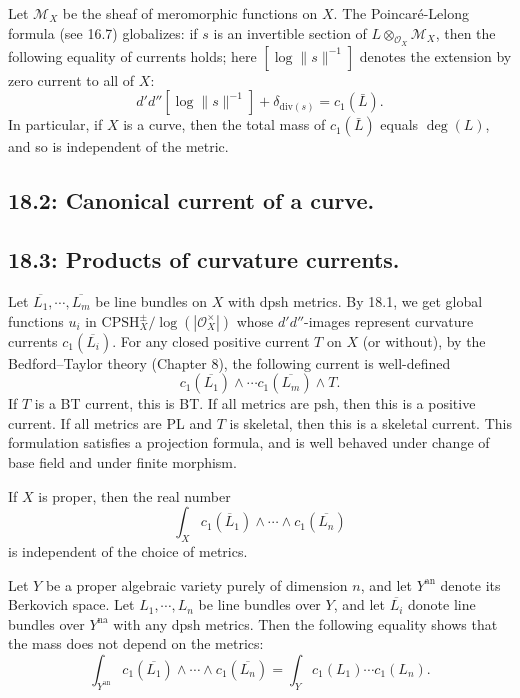 \documentclass[12pt,reqno]{amsart}
\theoremstyle{definition}
\theoremstyle{remark}
\theoremstyle{citedrem}
\theoremstyle{cited}
\theoremstyle{citeddef}
\theoremstyle{step}
\newcommand{\na}{\mathrm{na}}
\begin{document}
Let $\mathcal{M}_X$ be the sheaf of meromorphic functions on $X$. The Poincar\'{e}-Lelong formula (see 16.7) globalizes: if $s$ is an invertible section of $L \otimes_{\mathcal{O}_X} \mathcal{M}_X$, then the following equality of currents holds; here $[\log\|s\|^{-1}]$ denotes the extension by zero current to all of $X$: 
\[d'd''[\log\|s\|^{-1}] + \delta_{\mathrm{div}(s)} = c_1(\bar{L}).\]
In particular, if $X$ is a curve, then the total mass of $c_1(\bar{L})$ equals $\deg(L)$, and so is independent of the metric. 

\subsection*{18.2: Canonical current of a curve. }

\subsection*{18.3: Products of curvature currents. }Let $\overline{L_1}, \cdots, \overline{L_m}$ be line bundles on $X$ with dpsh metrics. By 18.1, we get global functions $u_i$ in $\mathrm{CPSH}_X^\pm / \log(|\mathcal{O}_X^\times|)$ whose $d'd''$-images represent curvature currents $c_1(\overline{L_i})$. For any closed positive current $T$ on $X$ (or without), by the Bedford--Taylor theory (Chapter 8), the following current is well-defined 
\[c_1(\overline{L_1}) \wedge \cdots c_1(\overline{L_m}) \wedge T.\]
If $T$ is a BT current, this is BT. If all metrics are psh, then this is a positive current. If all metrics are PL and $T$ is skeletal, then this is a skeletal current. This formulation satisfies a projection formula, and is well behaved under change of base field and under finite morphism. 

If $X$ is proper, then the real number 
\[\int_X c_1(\overline{L}_1) \wedge \cdots \wedge c_1(\overline{L_n})\] is independent of the choice of metrics. 

Let $Y$ be a proper algebraic variety purely of dimension $n$, and let $Y^{\mathrm{an}}$ denote its Berkovich space. Let $L_1, \cdots, L_n$ be line bundles over $Y$, and let $\overline{L_i}$ donote line bundles over $Y^\na$ with any dpsh metrics. Then the following equality shows that the mass does not depend on the metrics: 
\[\int_{Y^{\mathrm{an}}} c_1(\overline{L_1}) \wedge \cdots \wedge c_1(\overline{L_n}) = \int_Y c_1(L_1) \cdots c_1(L_n).\]
\end{document}
